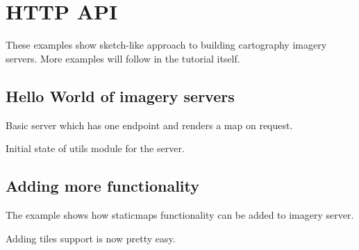 \documentclass[letterpaper]{article}
\begin{document}
\begin{centering}
    
\end{centering}


\pagebreak

\section{HTTP API}
\label{sec:http-api}

These examples show sketch-like approach to building cartography imagery servers.
More examples will follow in the tutorial itself.

\subsection{Hello World of imagery servers}
\label{sec:hellow-world-imagery}

Basic server which has one endpoint and renders a map on request.

\begin{centering}
  
\end{centering}

Initial state of utils module for the server.

\begin{centering}
    
\end{centering}

\subsection{Adding more functionality}
\label{sec:adding-more-funct}

The example shows how staticmaps functionality can be added to imagery server.

\begin{centering}
    
\end{centering}

Adding tiles support is now pretty easy.

\begin{centering}
    
\end{centering}
\begin{centering}
    
\end{centering}
\end{document}
